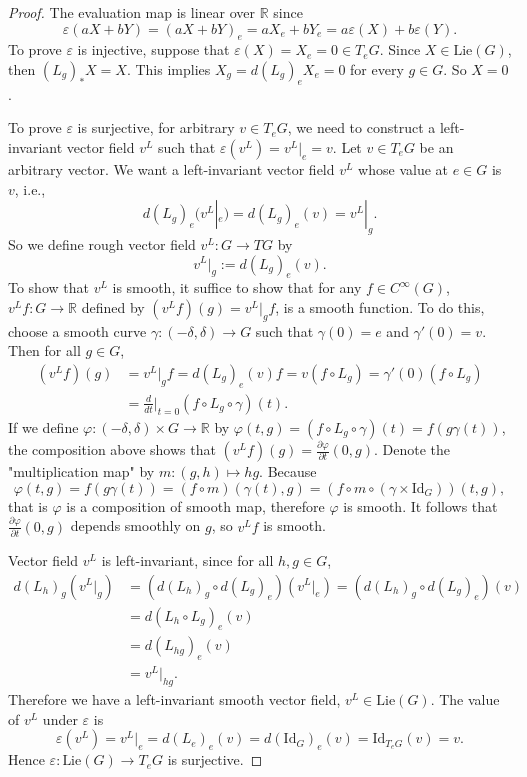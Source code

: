 \documentclass[a4paper]{article}
\theoremstyle{remark}
\newcommand{\er}{\mathbb{R}} %
\newcommand{\doo}{\partial}    %
\newcommand{\Coo}{C^{\infty}}  %
\begin{document}
\begin{proof}
The evaluation map is linear over $\er$ since
$$
\varepsilon(aX+bY) = (aX+bY)_e =aX_e + b Y_e = a\varepsilon(X) + b \varepsilon(Y). 
$$
To prove $\varepsilon$ is injective, suppose that $\varepsilon(X) =X_e= 0 \in T_eG$. Since $X \in \text{Lie}(G)$, then $(L_g)_* X = X$. This implies $X_g = d(L_g)_e X_e = 0$ for every $g \in G$. So $X=0$.

To prove $\varepsilon$ is surjective, for arbitrary $v \in T_eG$, we need to construct a left-invariant vector field $v^L$ such that $\varepsilon(v^L) = v^L|_e= v$. Let $v\in T_eG$ be an arbitrary vector. We want a left-invariant vector field $v^L$ whose value at $e\in G$ is $v$, i.e.,
$$
d(L_g)_{e}(v^L|_e) = d(L_g)_{e}(v) =  v^L|_g.
$$ 
So we define rough vector field $v^L : G \to TG$ by
$$
v^L|_g := d(L_g)_{e}(v).  
$$ 
To show that $v^L$ is smooth, it suffice to show that for any $f \in \Coo(G)$, $v^Lf : G \to \er$ defined by $(v^Lf)(g) = v^L|_gf$, is a smooth function. To do this, choose a smooth curve $\gamma : (-\delta,\delta) \to G$ such that $\gamma(0) =e$ and $\gamma'(0) = v$. Then for all $g \in G$,
\begin{align*}
(v^Lf)(g) &= v^L|_gf = d(L_g)_{e}(v)f = v(f \circ L_g) = \gamma'(0)(f \circ L_g) \\ &= \frac{d}{dt}\bigg|_{t=0} (f \circ L_g \circ \gamma)(t).
\end{align*}
If we define $\varphi : (-\delta,\delta) \times G \to \er$ by $\varphi (t,g) = (f\circ L_g \circ \gamma)(t) = f (g\gamma(t))$, the composition above shows that $(v^Lf)(g) = \frac{\doo \varphi}{\doo t}(0,g)$. Denote the "multiplication map" by $m : (g,h) \mapsto hg$. Because
$$
\varphi(t,g) =f(g\gamma(t)) = (f \circ m)(\gamma(t),g) = (f \circ m\circ (\gamma \times \text{Id}_G ))(t,g),
$$
that is $\varphi$ is a composition of smooth map, therefore $\varphi$ is smooth. It follows that $\frac{\doo \varphi}{\doo t}(0,g)$ depends smoothly on $g$, so $v^Lf$ is smooth.

Vector field $v^L$ is left-invariant, since for all $h,g \in G$,
\begin{align*}
d(L_h)_g (v^L|_g) &= (d(L_h)_g \circ d(L_g)_e)(v^L|_e) =(d(L_h)_g \circ d(L_g)_e)(v) \\ &=d(L_h \circ L_g)_e(v) \\ &= d(L_{hg})_e(v) \\ &= v^L|_{hg}.
\end{align*}
Therefore we have a left-invariant smooth vector field, $v^L \in \text{Lie}(G)$. The value of $v^L$ under $\varepsilon$ is
$$
\varepsilon(v^L) = v^L|_e = d(L_e)_e(v) = d(\text{Id}_G)_e(v) = \text{Id}_{T_eG}(v) = v.
$$ 
Hence $\varepsilon : \text{Lie}(G) \to T_eG$ is surjective.
\end{proof}
\end{document}

